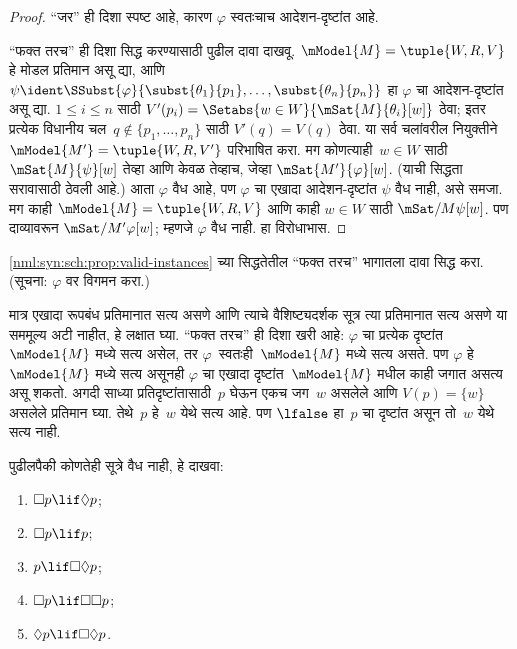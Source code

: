 \begin{proof}
  ``जर'' ही दिशा स्पष्ट आहे, कारण $\varphi$ स्वतःचाच
  आदेशन-दृष्टांत आहे.

  ``फक्त तरच'' ही दिशा सिद्ध करण्यासाठी पुढील दावा दाखवू.
  $\mModel{M} = \tuple{W, R, V}$ हे मोडल प्रतिमान असू द्या,
  आणि $\psi \ident
  \SSubst{\varphi}{\subst{\theta_1}{p_1},\dots,\subst{\theta_n}{p_n}}$ हा
  $\varphi$ चा आदेशन-दृष्टांत असू द्या. $1 \leq i \leq n$ साठी
  $V'(p_i) = \Setabs{w \in W}{\mSat{M}{\theta_i}[w]}$ ठेवा;
  इतर प्रत्येक विधानीय चल~$q \notin \{p_1,\dots,p_n\}$
  साठी $V'(q)=V(q)$ ठेवा. या सर्व चलांवरील नियुक्तीने
  $\mModel{M'} = \tuple{W, R,V'}$ परिभाषित करा.
  मग कोणत्याही~$w \in W$ साठी
  $\mSat{M}{\psi}[w]$ तेव्हा आणि केवळ तेव्हाच, जेव्हा
  $\mSat{M'}{\varphi}[w]$. (याची सिद्धता सरावासाठी ठेवली आहे.)
  आता $\varphi$ वैध आहे, पण $\varphi$ चा एखादा आदेशन-दृष्टांत
  $\psi$ वैध नाही, असे समजा. मग काही
  $\mModel{M} = \tuple{W, R, V}$ आणि काही $w \in W$
  साठी $\mSat/{M}{\psi}[w]$. पण दाव्यावरून
  $\mSat/{M'}{\varphi}[w]$; म्हणजे $\varphi$ वैध नाही. हा विरोधाभास.
\end{proof}

\begin{prob}
  \ref{nml:syn:sch:prop:valid-instances} च्या सिद्धतेतील
  ``फक्त तरच'' भागातला दावा सिद्ध करा. (सूचना:
  $\varphi$ वर विगमन करा.)
\end{prob}

मात्र एखादा रूपबंध प्रतिमानात सत्य असणे आणि त्याचे
वैशिष्ट्यदर्शक सूत्र त्या प्रतिमानात सत्य असणे या सममूल्य
अटी नाहीत, हे लक्षात घ्या. ``फक्त तरच'' ही दिशा खरी आहे:
$\varphi$ चा प्रत्येक दृष्टांत~$\mModel{M}$ मध्ये सत्य असेल,
तर $\varphi$~स्वतःही~$\mModel{M}$ मध्ये सत्य असते. पण
$\varphi$ हे~$\mModel{M}$ मध्ये सत्य असूनही $\varphi$ चा एखादा
दृष्टांत~$\mModel{M}$ मधील काही जगात असत्य असू शकतो.
अगदी साध्या प्रतिदृष्टांतासाठी~$p$ घेऊन एकच जग~$w$ असलेले आणि
$V(p) = \{w\}$ असलेले प्रतिमान घ्या. तेथे~$p$ हे~$w$
येथे सत्य आहे. पण $\lfalse$ हा~$p$ चा दृष्टांत असून
तो~$w$ येथे सत्य नाही.

\begin{prob}
  पुढीलपैकी कोणतेही सूत्रे वैध नाही, हे दाखवा:
  \begin{enumerate}
    \item[\Ax{D}:] \quad $\Box p \lif \Diamond p$;
    \item[\Ax{T}:] \quad $\Box p \lif p$;
    \item[\Ax{B}:] \quad $p \lif \Box\Diamond p$;
    \item[\Ax{4}:] \quad $\Box p \lif \Box \Box p$;
    \item[\Ax{5}:] \quad $\Diamond p \lif \Box \Diamond
      p$.
  \end{enumerate}
\end{prob}

